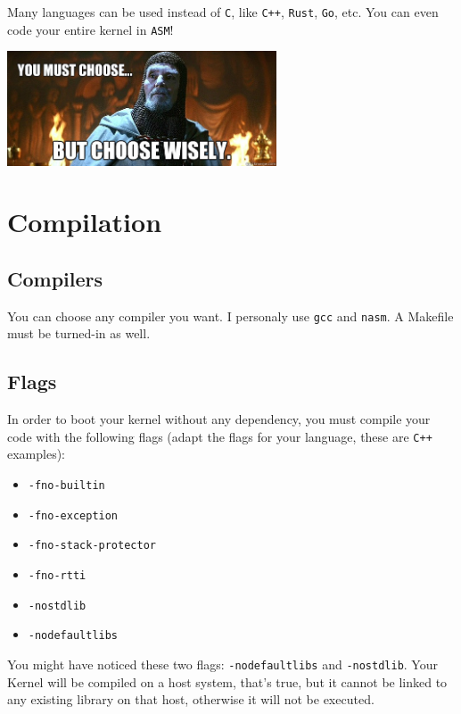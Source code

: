 \documentclass{42-en}
\begin{document}
            Many languages can be used instead of \texttt{C},
            like \texttt{C++}, \texttt{Rust}, \texttt{Go}, etc.
            You can even code your entire kernel in \texttt{ASM}!\\
            \begin{center}
              \includegraphics[width=8cm]{choose.jpg}
            \end{center}
\newpage

    \section{Compilation}
        \subsection{Compilers}
            You can choose any compiler you want. I personaly use \texttt{gcc}
            and \texttt{nasm}. A Makefile must be turned-in as well.
        \subsection{Flags}
            In order to boot your kernel without any dependency, you must
            compile your code with the following flags (adapt the flags for
            your language, these are \texttt{C++} examples):
            \begin{itemize}\itemsep1pt
                \item \texttt{-fno-builtin}
                \item \texttt{-fno-exception}
                \item \texttt{-fno-stack-protector}
                \item \texttt{-fno-rtti}
                \item \texttt{-nostdlib}
                \item \texttt{-nodefaultlibs}
            \end{itemize}
            You might have noticed these two flags: \texttt{-nodefaultlibs}
            and \texttt{-nostdlib}. Your Kernel will be compiled on a host
            system, that's true, but it cannot be linked to any existing
            library on that host, otherwise it will not be executed.
\end{document}
